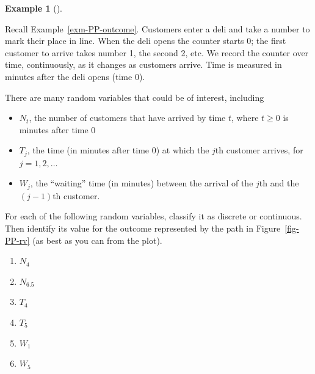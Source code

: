 \documentclass[
  letterpaper,
  DIV=11,
  numbers=noendperiod]{scrreprt}
\providecommand{\tightlist}{%
  \setlength{\itemsep}{0pt}\setlength{\parskip}{0pt}}
\theoremstyle{plain}
\theoremstyle{definition}
\newtheorem{example}{Example}[chapter]
\theoremstyle{definition}
\theoremstyle{definition}
\theoremstyle{remark}
\begin{document}
\begin{tcolorbox}[enhanced jigsaw, opacityback=0, left=2mm, colframe=quarto-callout-note-color-frame, toprule=.15mm, breakable, colback=white, leftrule=.75mm, arc=.35mm, rightrule=.15mm, bottomrule=.15mm]

\begin{example}[]\protect\hypertarget{exm-PP-rv}{}\label{exm-PP-rv}

Recall Example~\ref{exm-PP-outcome}. Customers enter a deli and take a
number to mark their place in line. When the deli opens the counter
starts 0; the first customer to arrive takes number 1, the second 2,
etc. We record the counter over time, continuously, as it changes as
customers arrive. Time is measured in minutes after the deli opens (time
0).

There are many random variables that could be of interest, including

\begin{itemize}
\tightlist
\item
  \(N_t\), the number of customers that have arrived by time \(t\),
  where \(t\ge0\) is minutes after time 0
\item
  \(T_j\), the time (in minutes after time 0) at which the \(j\)th
  customer arrives, for \(j=1, 2, \ldots\)
\item
  \(W_j\), the ``waiting'' time (in minutes) between the arrival of the
  \(j\)th and the \((j-1)\)th customer.
\end{itemize}

For each of the following random variables, classify it as discrete or
continuous. Then identify its value for the outcome represented by the
path in Figure~\ref{fig-PP-rv} (as best as you can from the plot).

\begin{enumerate}
\def\labelenumi{\arabic{enumi}.}
\tightlist
\item
  \(N_4\)
\item
  \(N_{6.5}\)
\item
  \(T_4\)
\item
  \(T_5\)
\item
  \(W_1\)
\item
  \(W_5\)
\end{enumerate}

\end{example}

\end{tcolorbox}
\end{document}
